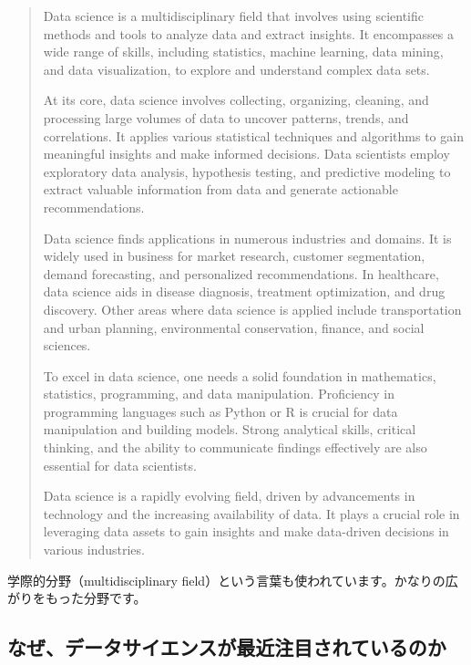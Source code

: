 \documentclass[
  xelatex, ja=standard]{bxjsbook}
\theoremstyle{definition}
\theoremstyle{definition}
\theoremstyle{definition}
\theoremstyle{definition}
\theoremstyle{remark}
\begin{document}
\begin{quote}
Data science is a multidisciplinary field that involves using scientific methods and tools to analyze data and extract insights. It encompasses a wide range of skills, including statistics, machine learning, data mining, and data visualization, to explore and understand complex data sets.

At its core, data science involves collecting, organizing, cleaning, and processing large volumes of data to uncover patterns, trends, and correlations. It applies various statistical techniques and algorithms to gain meaningful insights and make informed decisions. Data scientists employ exploratory data analysis, hypothesis testing, and predictive modeling to extract valuable information from data and generate actionable recommendations.

Data science finds applications in numerous industries and domains. It is widely used in business for market research, customer segmentation, demand forecasting, and personalized recommendations. In healthcare, data science aids in disease diagnosis, treatment optimization, and drug discovery. Other areas where data science is applied include transportation and urban planning, environmental conservation, finance, and social sciences.

To excel in data science, one needs a solid foundation in mathematics, statistics, programming, and data manipulation. Proficiency in programming languages such as Python or R is crucial for data manipulation and building models. Strong analytical skills, critical thinking, and the ability to communicate findings effectively are also essential for data scientists.

Data science is a rapidly evolving field, driven by advancements in technology and the increasing availability of data. It plays a crucial role in leveraging data assets to gain insights and make data-driven decisions in various industries.
\end{quote}

学際的分野（multidisciplinary field）という言葉も使われています。かなりの広がりをもった分野です。

\hypertarget{ux306aux305cux30c7ux30fcux30bfux30b5ux30a4ux30a8ux30f3ux30b9ux304cux6700ux8fd1ux6ce8ux76eeux3055ux308cux3066ux3044ux308bux306eux304b}{%
\subsection{なぜ、データサイエンスが最近注目されているのか}\label{ux306aux305cux30c7ux30fcux30bfux30b5ux30a4ux30a8ux30f3ux30b9ux304cux6700ux8fd1ux6ce8ux76eeux3055ux308cux3066ux3044ux308bux306eux304b}}
\end{document}
